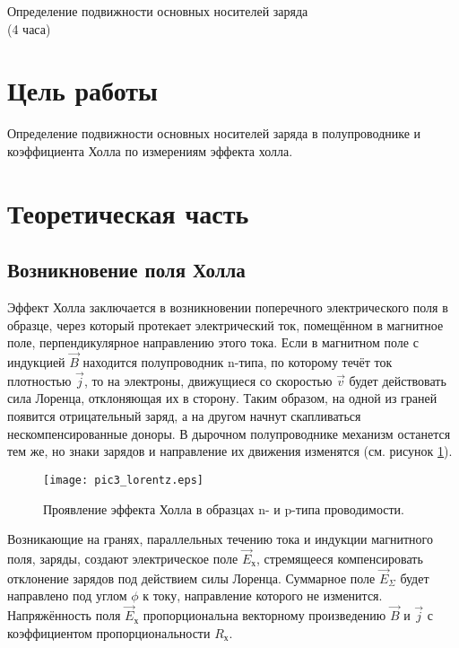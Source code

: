 \newpage

\setcounter{chapter}{3}
\setcounter{section}{0}
\setcounter{figure}{0}
\setcounter{table}{0}
\setcounter{equation}{0}

\begin{center}
Определение подвижности основных носителей заряда \\
(4 часа)
\end{center}

\section{Цель работы}
Определение подвижности основных носителей заряда в полупроводнике и коэффициента Холла по измерениям эффекта холла.

\section{Теоретическая часть}

\subsection{Возникновение поля Холла}

Эффект Холла заключается в возникновении поперечного электрического поля в образце, через который протекает электрический ток, помещённом в магнитное поле, перпендикулярное направлению этого тока. Если в магнитном поле с индукцией $\overrightarrow{B}$ находится полупроводник n-типа, по которому течёт ток плотностью $\overrightarrow{j}$, то на электроны, движущиеся со скоростью $\overrightarrow{v}$ будет действовать сила Лоренца, отклоняющая их в сторону. Таким образом, на одной из граней появится отрицательный заряд, а на другом начнут скапливаться нескомпенсированные доноры. В дырочном полупроводнике механизм останется тем же, но знаки зарядов и направление их движения изменятся (см. рисунок \ref{pic3_lorentz}).

\begin{figure}[h!]\centering
\texttt{[image: pic3\_lorentz.eps]}
\caption{Проявление эффекта Холла в образцах n- и p-типа проводимости.}
\label{pic3_lorentz}
\end{figure}

Возникающие на гранях, параллельных течению тока и индукции магнитного поля, заряды, создают электрическое поле $\overrightarrow{E}_{\text{х}}$, стремящееся компенсировать отклонение зарядов под действием силы Лоренца. Суммарное поле $\overrightarrow{E}_{\Sigma}$ будет направлено под углом $\phi$ к току, направление которого не изменится. Напряжённость поля $\overrightarrow{E}_{\text{х}}$ пропорциональна векторному произведению $\overrightarrow{B}$ и $\overrightarrow{j}$ с коэффициентом пропорциональности $R_{\text{х}}$.

